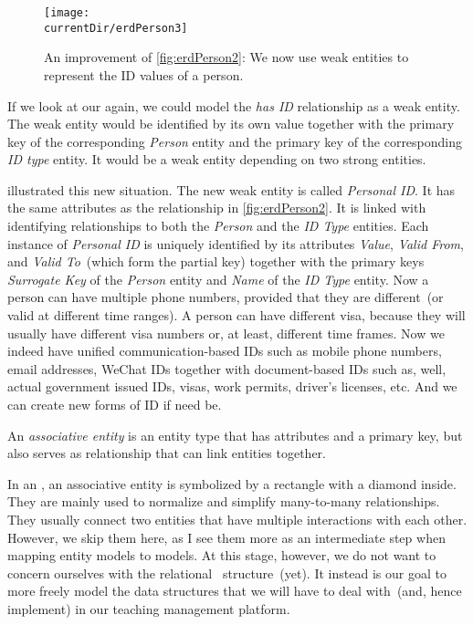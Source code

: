 \begin{figure}%
\centering%
\texttt{[image: \\currentDir/erdPerson3]}%
\caption{An improvement of \cref{fig:erdPerson2}: We now use weak entities to represent the ID values of a person.}%
\label{fig:erdPerson3}%
\end{figure}%
%
If we look at our  again, we could model the \emph{has ID} relationship as a weak entity.
The weak entity would be identified by its own value together with the primary key of the corresponding \emph{Person} entity and the primary key of the corresponding \emph{ID type} entity.
It would be a weak entity depending on two strong entities.

 illustrated this new situation.
The new weak entity is called \emph{Personal ID}.
It has the same attributes as the relationship in \cref{fig:erdPerson2}.
It is linked with identifying relationships to both the \emph{Person} and the \emph{ID Type} entities.
Each instance of \emph{Personal ID} is uniquely identified by its attributes \emph{Value}, \emph{Valid From}, and \emph{Valid To}~(which form the partial key) together with the primary keys \emph{Surrogate Key} of the \emph{Person} entity and \emph{Name} of the \emph{ID Type} entity.
Now a person can have multiple phone numbers, provided that they are different~(or valid at different time ranges).
A person can have different visa, because they will usually have different visa numbers or, at least, different time frames.
Now we indeed have unified communication-based IDs such as mobile phone numbers, email addresses, WeChat IDs together with document-based IDs such as, well, actual government issued IDs, visas, work permits, driver's licenses, etc.
And we can create new forms of ID if need be.%
%
\begin{definition}%
An \emph{associative entity} is an entity type that has attributes and a primary key, but also serves as relationship that can link entities together.%
\end{definition}%
%
In an , an associative entity is symbolized by a rectangle with a diamond inside.
They are mainly used to normalize and simplify many-to-many relationships.
They usually connect two entities that have multiple interactions with each other.
However, we skip them here, as I see them more as an intermediate step when mapping entity models to  models.
At this stage, however, we do not want to concern ourselves with the relational \db\ structure~(yet).
It instead is our goal to more freely model the data structures that we will have to deal with~(and, hence implement) in our teaching management platform.%
%
\FloatBarrier%
\endhsection%
%
